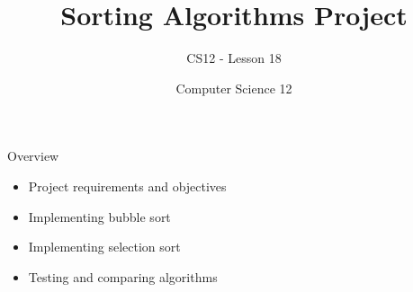 \documentclass[10pt]{beamer}
\title{Sorting Algorithms Project}
\subtitle{CS12 - Lesson 18}
\author{Computer Science 12}
\date{}
\begin{document}
\begin{frame}
    \titlepage
\end{frame}

\begin{frame}{Overview}
    \begin{itemize}
        \item Project requirements and objectives
        \item Implementing bubble sort
        \item Implementing selection sort
        \item Testing and comparing algorithms
    \end{itemize}
\end{frame}

\end{document}
